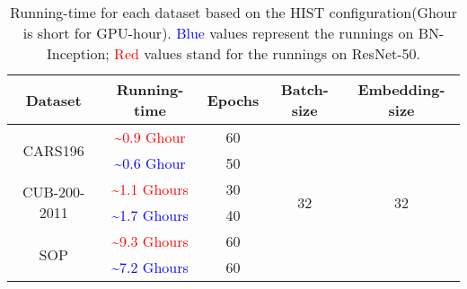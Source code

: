\begin{table}[ht!]
\centering
\begin{tabular}{ccccc}
\toprule[0.8pt]
\textbf{Dataset}                       & \textbf{Running-time}    & \textbf{Epochs} & \textbf{Batch-size}          & \textbf{Embedding-size}      \\ \hline \hline
\multirow{2}{*}{CARS196}      & \textcolor{red}{\textasciitilde0.9 Ghour} & 60     & \multirow{6}{*}{32} & \multirow{6}{*}{32} \\
                              & \textcolor{blue}{\textasciitilde0.6 Ghour} & 50     &                     &                     \\
\multirow{2}{*}{CUB-200-2011} & \textcolor{red}{\textasciitilde1.1 Ghours} & 30     &                     &                     \\
                              & \textcolor{blue}{\textasciitilde1.7 Ghours} & 40     &                     &                     \\
\multirow{2}{*}{SOP}          & \textcolor{red}{\textasciitilde9.3 Ghours} & 60     &                     &                     \\
                              & \textcolor{blue}{\textasciitilde7.2 Ghours} & 60     &                     &                     \\ 
\bottomrule[0.8pt]
\end{tabular}
\caption{Running-time for each dataset based on the HIST configuration(Ghour is short for GPU-hour). \textcolor{blue}{Blue} values represent the runnings on BN-Inception; \textcolor{red}{Red} values stand for the runnings on ResNet-50.}
\label{Running_time}
\end{table}


